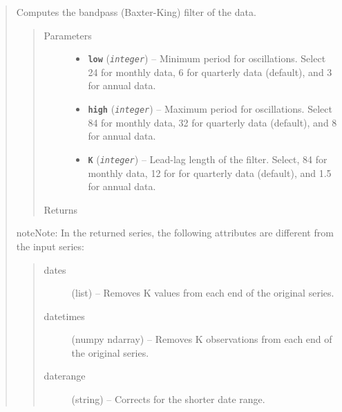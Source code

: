 \documentclass[letterpaper,10pt,english]{sphinxmanual}
\begin{document}
\begin{fulllineitems}
\begin{quote}

\begin{fulllineitems}
\label{series_class:fredpy.series.bpfilter}
Computes the bandpass (Baxter-King) filter of the data.
\begin{quote}\begin{description}
\item[{Parameters}] \leavevmode\begin{itemize}
\item {} 
\textbf{\texttt{low}} (\emph{\texttt{integer}}) -- Minimum period for oscillations. Select 24 for monthly data, 6 for quarterly data (default), and 3 for annual data.

\item {} 
\textbf{\texttt{high}} (\emph{\texttt{integer}}) -- Maximum period for oscillations. Select 84 for monthly data, 32 for quarterly data (default), and 8 for annual data.

\item {} 
\textbf{\texttt{K}} (\emph{\texttt{integer}}) -- Lead-lag length of the filter. Select, 84 for monthly data, 12 for for quarterly data (default), and 1.5 for annual data.

\end{itemize}

\item[{Returns}] \leavevmode
{\hyperref[series_class:fredpy.series]{}}

\end{description}\end{quote}

\begin{notice}{note}{Note:}
In the returned series, the following attributes are different from the input series:
\begin{quote}\begin{description}
\item[{dates}] \leavevmode
(list) --  Removes K values from each end of the original series.

\item[{datetimes}] \leavevmode
(numpy ndarray) --  Removes K observations from each end of the original series.

\item[{daterange}] \leavevmode
(string) -- Corrects for the shorter date range.


\end{description}
\end{quote}
\end{notice}
\end{fulllineitems}
\end{quote}
\end{fulllineitems}
\end{document}
